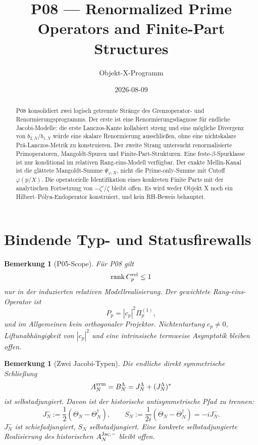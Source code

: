 \documentclass[11pt,a4paper]{amsart}
\title[P08 --- Renormalized Prime Operators]{P08 --- Renormalized Prime Operators and Finite-Part Structures}
\author{Objekt-X-Programm}
\date{2026-08-09}
\newtheorem{remark}[theorem]{Bemerkung}
\begin{document}
\begin{abstract}
P08 konsolidiert zwei logisch getrennte Stränge des Grenzoperator- und
Renormierungsprogramms. Der erste ist eine Renormierungsdiagnose für endliche
Jacobi-Modelle: die erste Lanczos-Kante kollabiert streng und eine mögliche
Divergenz von $b_{2,N}/b_{1,N}$ würde eine skalare Renormierung ausschließen,
ohne eine nichtskalare Prä-Lanczos-Metrik zu konstruieren. Der zweite Strang
untersucht renormalisierte Primoperatoren, Mangoldt-Spuren und
Finite-Part-Strukturen. Eine feste-$\beta$-Spurklasse ist nur konditional im
relativen Rang-eins-Modell verfügbar. Der exakte Mellin-Kanal ist die
glättete Mangoldt-Summe $\Psi_{\varphi,X}$, nicht die Prime-only-Summe mit
Cutoff $\varphi(p/X)$. Die operatorielle Identifikation eines konkreten
Finite Parts mit der analytischen Fortsetzung von $-\zeta'/\zeta$ bleibt
offen. Es wird weder Objekt X noch ein Hilbert--Pólya-Endoperator konstruiert,
und kein RH-Beweis behauptet.
\end{abstract}

\maketitle

\section{Bindende Typ- und Statusfirewalls}

\begin{remark}[P05-Scope]\label{rem:p05-scope}
Für P08 gilt
\[
  \operatorname{rank}C_p^{\rm rel}\le1
\]
nur in der induzierten relativen Modellrealisierung. Der gewichtete
Rang-eins-Operator ist
\[
  P_p=|c_p|^2\Pi_p^{(1)},
\]
und im Allgemeinen kein orthogonaler Projektor. Nichtentartung $c_p\ne0$,
Liftunabhängigkeit von $|c_p|^2$ und eine intrinsische termweise Asymptotik
bleiben offen.
\end{remark}

\begin{remark}[Zwei Jacobi-Typen]\label{rem:jacobi-types}
Die endliche direkt symmetrische Schließung
\[
  A_N^{\rm sym}=B_N^\Lambda=J_N^\Lambda+(J_N^\Lambda)^*
\]
ist selbstadjungiert. Davon ist der historische antisymmetrische Pfad zu
trennen:
\[
  J_N^-:=\frac12(\Theta_N-\Theta_N^\dagger),
  \qquad
  S_N:=\frac1{2i}(\Theta_N-\Theta_N^\dagger)=-iJ_N^-.
\]
$J_N^-$ ist schiefadjungiert, $S_N$ selbstadjungiert. Eine konkrete
selbstadjungierte Realisierung des historischen $A_N^{\rm Jac,-}$ bleibt
offen.
\end{remark}
\end{document}
